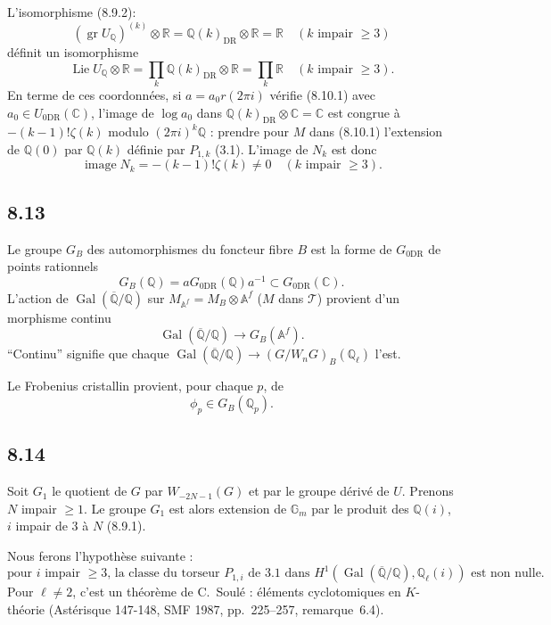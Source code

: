 \documentclass[12pt,a4paper]{article}
\theoremstyle{plain}
\theoremstyle{definition}
\theoremstyle{remark}
\DeclareMathOperator{\Lie}{Lie}
\DeclareMathOperator{\gr}{gr}
\DeclareMathOperator{\Gal}{Gal}
\DeclareMathOperator{\image}{image}
\newcommand{\Gm}{\mathbb{G}_m}
\newcommand{\Q}{\mathbb{Q}}
\newcommand{\C}{\mathbb{C}}
\newcommand{\R}{\mathbb{R}}
\newcommand{\Af}{\mathbb{A}^f}
\newcommand{\DR}{\mathrm{DR}}
\begin{document}
L'isomorphisme (8.9.2):
$$(\gr U_\Q)^{(k)} \otimes \R = \Q(k)_{\DR} \otimes \R = \R \quad (k \text{ impair } \geq 3)$$
d\'efinit un isomorphisme
$$\Lie U_\Q \otimes \R = \prod_k \Q(k)_{\DR} \otimes \R = \prod_k \R \quad (k \text{ impair } \geq 3).$$
En terme de ces coordonn\'ees, si $a = a_0 r(2\pi i)$ v\'erifie (8.10.1) avec $a_0 \in U_{0\DR}(\C)$, l'image de $\log a_0$ dans $\Q(k)_{\DR} \otimes \C = \C$ est congrue \`a $-(k-1)!\zeta(k)$ modulo $(2\pi i)^k \Q$ : prendre pour $M$ dans (8.10.1) l'extension de $\Q(0)$ par $\Q(k)$ d\'efinie par $P_{1,k}$ (3.1). L'image de $N_k$ est donc
\begin{equation}\label{8.12.1}
\image N_k = -(k-1)!\zeta(k) \neq 0 \quad (k \text{ impair } \geq 3). \tag{8.12.1}
\end{equation}

\subsection*{8.13}

Le groupe $G_B$ des automorphismes du foncteur fibre $B$ est la forme de $G_{0\DR}$ de points rationnels
\begin{equation}\label{8.13.1}
G_B(\Q) = a G_{0\DR}(\Q) a^{-1} \subset G_{0\DR}(\C). \tag{8.13.1}
\end{equation}
L'action de $\Gal(\overline{\Q}/\Q)$ sur $M_{\Af} = M_B \otimes \Af$ ($M$ dans $\mathcal{T}$) provient d'un morphisme continu
\begin{equation}\label{8.13.2}
\Gal(\overline{\Q}/\Q) \longrightarrow G_B(\Af). \tag{8.13.2}
\end{equation}
``Continu'' signifie que chaque $\Gal(\overline{\Q}/\Q) \to (G/W_nG)_B(\Q_\ell)$ l'est.

Le Frobenius cristallin provient, pour chaque $p$, de
\begin{equation}\label{8.13.3}
\phi_p \in G_B(\Q_p). \tag{8.13.3}
\end{equation}

\subsection*{8.14}

Soit $G_1$ le quotient de $G$ par $W_{-2N-1}(G)$ et par le groupe d\'eriv\'e de $U$. Prenons $N$ impair $\geq 1$. Le groupe $G_1$ est alors extension de $\Gm$ par le produit des $\Q(i)$, $i$ impair de $3$ \`a $N$ (8.9.1).

Nous ferons l'hypoth\`ese suivante :
\begin{equation}\label{8.14.1}
\text{pour $i$ impair $\geq 3$, la classe du torseur $P_{1,i}$ de 3.1 dans $H^1(\Gal(\overline{\Q}/\Q), \Q_\ell(i))$ est non nulle.} \tag{8.14.1}
\end{equation}
Pour $\ell \neq 2$, c'est un th\'eor\`eme de C.~Soul\'e : \'el\'ements cyclotomiques en $K$-th\'eorie (Ast\'erisque 147-148, SMF 1987, pp.~225--257, remarque~6.4).
\end{document}
